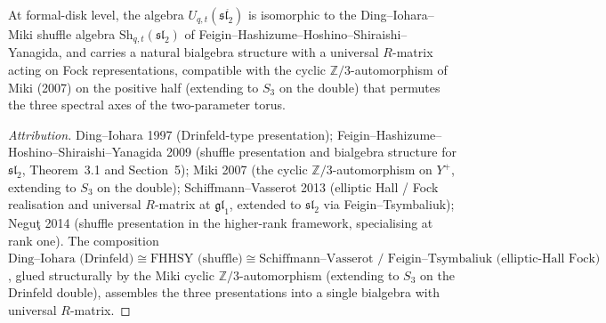 \begin{proposition}
\label{prop:kl-toroidal-sl2-algebra-side}
At formal-disk level, the algebra $U_{q,t}(\mathfrak{sl}_2^{\hat{\hat{\ }}})$ is isomorphic to the Ding--Iohara--Miki shuffle algebra $\mathrm{Sh}_{q,t}(\mathfrak{sl}_2)$ of Feigin--Hashizume--Hoshino--Shiraishi--Yanagida, and carries a natural bialgebra structure with a universal $R$-matrix acting on Fock representations, compatible with the cyclic $\mathbb{Z}/3$-automorphism of Miki (2007) on the positive half (extending to $S_3$ on the double) that permutes the three spectral axes of the two-parameter torus.
\end{proposition}

\begin{proof}[Attribution]
Ding--Iohara 1997 (Drinfeld-type presentation); Feigin--Hashizume--Hoshino--Shiraishi--Yanagida 2009 (shuffle presentation and bialgebra structure for $\mathfrak{sl}_2$, Theorem~3.1 and Section~5); Miki 2007 (the cyclic $\mathbb{Z}/3$-automorphism on $Y^+$, extending to $S_3$ on the double); Schiffmann--Vasserot 2013 (elliptic Hall / Fock realisation and universal $R$-matrix at $\mathfrak{gl}_1$, extended to $\mathfrak{sl}_2$ via Feigin--Tsymbaliuk); Negu\c{t} 2014 (shuffle presentation in the higher-rank framework, specialising at rank one). The composition $\text{Ding--Iohara (Drinfeld)} \cong \text{FHHSY (shuffle)} \cong \text{Schiffmann--Vasserot / Feigin--Tsymbaliuk (elliptic-Hall Fock)}$, glued structurally by the Miki cyclic $\mathbb{Z}/3$-automorphism (extending to $S_3$ on the Drinfeld double), assembles the three presentations into a single bialgebra with universal $R$-matrix.
\end{proof}

%
%

